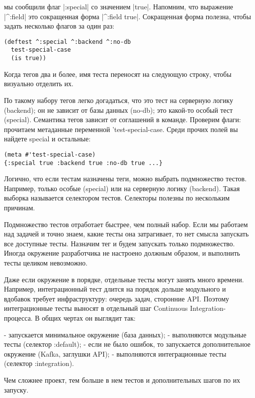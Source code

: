 мы сообщили флаг \spverb|:special| со значением \spverb|true|. Напомним, что
выражение \spverb|^:field| это сокращенная форма \spverb|^{:field true}|.
Сокращенная форма полезна, чтобы задать несколько флагов за один раз:

\begin{verbatim}
(deftest ^:special ^:backend ^:no-db
  test-special-case
  (is true))
\end{verbatim}

Когда тегов два и более, имя теста переносят на следующую строку, чтобы
визуально отделить их.

По такому набору тегов легко догадаться, что это тест на серверную логику
(backend); он не зависит от базы данных (no-db); это какой-то особый тест
(special). Семантика тегов зависит от соглашений в команде. Проверим флаги:
прочитаем метаданные переменной 'test-special-case. Среди прочих полей вы
найдете special и остальные:

\begin{verbatim}
(meta #'test-special-case)
{:special true :backend true :no-db true ...}
\end{verbatim}

Логично, что если тестам назначены теги, можно выбрать подмножество
тестов. Например, только особые (special) или на серверную логику
(backend). Такая выборка называется селектором тестов. Селекторы полезны по
нескольким причинам.

Подмножество тестов отработает быстрее, чем полный набор. Если мы работаем над
задачей и точно знаем, какие тесты она затрагивает, то нет смысла запускать все
доступные тесты. Назначим тег и будем запускать только подмножество. Иногда
окружение разработчика не настроено должным образом, и выполнить тесты целиком
невозможно.

Даже если окружение в порядке, отдельные тесты могут занять много
времени. Например, интеграционный тест длится на порядок дольше модульного и
вдобавок требует инфраструктуру: очередь задач, сторонние API. Поэтому
интеграционные тесты выносят в отдельный шаг Continuous Integration-процесса. В
общих чертах он выглядит так:

- запускается минимальное окружение (база данных);
- выполняются модульные тесты (селектор :default);
- если не было ошибок, то запускается дополнительное окружение (Kafka, заглушки
  API);
- выполняются интеграционные тесты (селектор :integration).

Чем сложнее проект, тем больше в нем тестов и дополнительных шагов по их
запуску.

